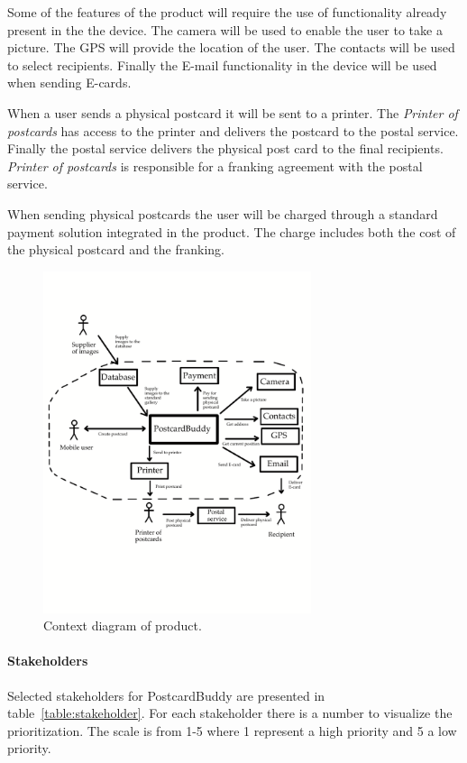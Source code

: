\documentclass[10pt,a4paper]{article}
\begin{document}
Some of the features of the product will require the use of functionality already present in the the device. The camera will be used to enable the user to take a picture. The GPS will provide the location of the user. The contacts will be used to select recipients. Finally the E-mail functionality in the device will be used when sending E-cards.
 
When a user sends a physical postcard it will be sent to a printer. The  \textit{Printer of postcards} has access to the printer and delivers the postcard to the postal service.  Finally the postal service delivers the physical post card to the final recipients. \textit{Printer of postcards} is responsible for a franking agreement with the postal service.

When sending physical postcards the user will be charged through a standard payment solution integrated in the product. The charge includes both the cost of the physical postcard and the franking. 

\begin{figure}[h!]
\centering
\includegraphics[width=0.7\textwidth]{ContextDiagram5.pdf}
\caption{Context diagram of product.}
\label{fig:context}
\end{figure}
\FloatBarrier

\paragraph{Stakeholders}
Selected stakeholders for PostcardBuddy are presented in table~\ref{table:stakeholder}. For each stakeholder there is a number to visualize the prioritization. The scale is from 1-5 where 1 represent a high priority and 5 a low priority.
\end{document}
